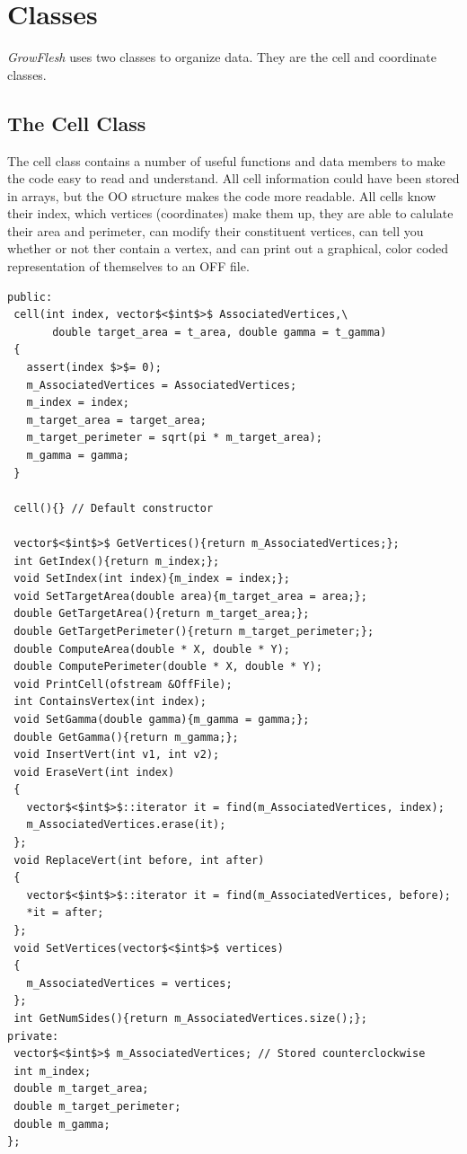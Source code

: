 \section{Classes}
\emph{GrowFlesh} uses two classes to organize data. They are the cell and coordinate classes.
\subsection{The Cell Class}
The cell class contains a number of useful functions and data members to make the code easy to read and understand. All cell information could have been stored in arrays, but the OO structure makes the code more readable. All cells know their index, which vertices (coordinates) make them up, they are able to calulate their area and perimeter, can modify their constituent vertices, can tell you whether or not ther contain a vertex, and can print out a graphical, color coded representation of themselves to an OFF file.
\begin{lstlisting}
public:
 cell(int index, vector$<$int$>$ AssociatedVertices,\
       double target_area = t_area, double gamma = t_gamma)
 {	
   assert(index $>$= 0);
   m_AssociatedVertices = AssociatedVertices;
   m_index = index;
   m_target_area = target_area;
   m_target_perimeter = sqrt(pi * m_target_area);
   m_gamma = gamma; 
 }
	
 cell(){} // Default constructor
	
 vector$<$int$>$ GetVertices(){return m_AssociatedVertices;};
 int GetIndex(){return m_index;};
 void SetIndex(int index){m_index = index;};
 void SetTargetArea(double area){m_target_area = area;};
 double GetTargetArea(){return m_target_area;};
 double GetTargetPerimeter(){return m_target_perimeter;};
 double ComputeArea(double * X, double * Y);
 double ComputePerimeter(double * X, double * Y);
 void PrintCell(ofstream &OffFile);
 int ContainsVertex(int index);
 void SetGamma(double gamma){m_gamma = gamma;};
 double GetGamma(){return m_gamma;};
 void InsertVert(int v1, int v2);
 void EraseVert(int index)
 {
   vector$<$int$>$::iterator it = find(m_AssociatedVertices, index); 
   m_AssociatedVertices.erase(it);
 };
 void ReplaceVert(int before, int after)
 {
   vector$<$int$>$::iterator it = find(m_AssociatedVertices, before); 
   *it = after;
 };
 void SetVertices(vector$<$int$>$ vertices)
 {
   m_AssociatedVertices = vertices;
 };
 int GetNumSides(){return m_AssociatedVertices.size();};
private:
 vector$<$int$>$ m_AssociatedVertices; // Stored counterclockwise
 int m_index;	
 double m_target_area;
 double m_target_perimeter;
 double m_gamma;
};

\end{lstlisting}

